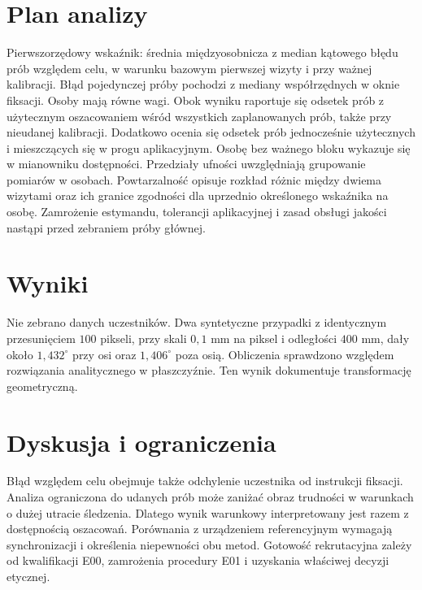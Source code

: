 \documentclass[11pt,a4paper]{article}
\begin{document}
\section{Plan analizy}
Pierwszorzędowy wskaźnik: średnia międzyosobnicza z median kątowego błędu prób względem celu, w warunku bazowym pierwszej wizyty i przy ważnej kalibracji. Błąd pojedynczej próby pochodzi z mediany współrzędnych w oknie fiksacji. Osoby mają równe wagi. Obok wyniku raportuje się odsetek prób z użytecznym oszacowaniem wśród wszystkich zaplanowanych prób, także przy nieudanej kalibracji. Dodatkowo ocenia się odsetek prób jednocześnie użytecznych i mieszczących się w progu aplikacyjnym. Osobę bez ważnego bloku wykazuje się w mianowniku dostępności. Przedziały ufności uwzględniają grupowanie pomiarów w osobach. Powtarzalność opisuje rozkład różnic między dwiema wizytami oraz ich granice zgodności dla uprzednio określonego wskaźnika na osobę. Zamrożenie estymandu, tolerancji aplikacyjnej i zasad obsługi jakości nastąpi przed zebraniem próby głównej.

\section{Wyniki}
Nie zebrano danych uczestników. Dwa syntetyczne przypadki z identycznym przesunięciem $100$ pikseli, przy skali $0{,}1$ mm na piksel i odległości $400$ mm, dały około $1{,}432^\circ$ przy osi oraz $1{,}406^\circ$ poza osią. Obliczenia sprawdzono względem rozwiązania analitycznego w płaszczyźnie. Ten wynik dokumentuje transformację geometryczną.

\section{Dyskusja i ograniczenia}
Błąd względem celu obejmuje także odchylenie uczestnika od instrukcji fiksacji. Analiza ograniczona do udanych prób może zaniżać obraz trudności w warunkach o dużej utracie śledzenia. Dlatego wynik warunkowy interpretowany jest razem z dostępnością oszacowań. Porównania z urządzeniem referencyjnym wymagają synchronizacji i określenia niepewności obu metod. Gotowość rekrutacyjna zależy od kwalifikacji E00, zamrożenia procedury E01 i uzyskania właściwej decyzji etycznej.


\end{document}
